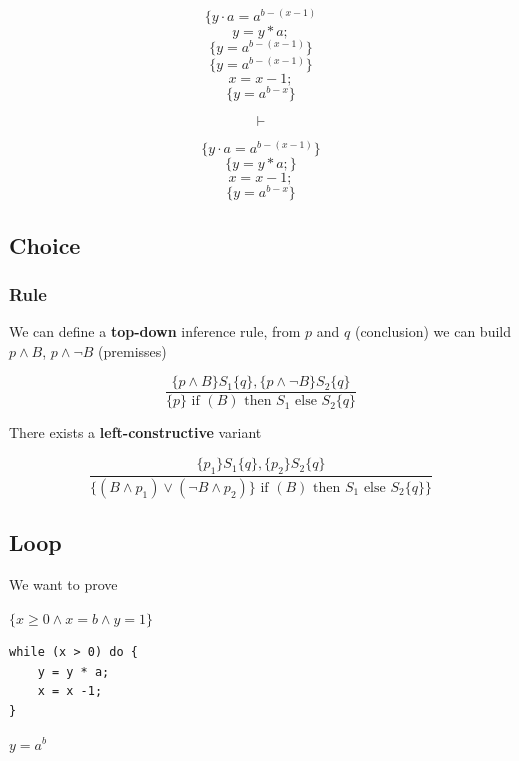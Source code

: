 \documentclass[12pt, a4paper]{book}
\begin{document}
    \begin{minipage}{\linewidth}
        \begin{minipage}{0.4\linewidth}
            $$ \{ y \cdot a = {a}^{b-(x-1)} $$
            $$ y = y * a; $$
            $$ \{ y = {a}^{b-(x-1)} \} $$
            \bigskip
            $$ \{ y = {a}^{b-(x-1)} \} $$
            $$ x = x - 1; $$
            $$ \{ y = {a}^{b-x} \} $$
        \end{minipage}
        \begin{minipage}{0.05\linewidth}
            $$ \vdash $$
        \end{minipage}
        \begin{minipage}{0.4\linewidth}
            $$ \{ y \cdot a = {a}^{b-(x-1)} \} $$
            $$ \{ y = y * a; \} $$
            $$ x = x - 1; $$
            $$ \{ y = {a}^{b-x} \} $$
        \end{minipage}
    \end{minipage}

    \subsection{Choice}

    \subsubsection{Rule}

    We can define a \textbf{top-down} inference rule, from $p$ and $q$
    (conclusion) we can build $p \land B$, $p \land \lnot B$ (premisses)

    $$
    \frac
    { \{ p \land B \} S_1 \{ q \}, \{ p \land \lnot B \} S_2 \{ q \} }
    { \{ p \} \textrm{ if } (B) \textrm{ then } S_1 \textrm{ else } S_2 \{ q \} }
    $$

    There exists a \textbf{left-constructive} variant

    $$
    \frac
    { \{ p_1 \} S_1 \{ q \}, \{ p_2 \} S_2 \{ q \} }
    { \{ (B \land p_1 ) \lor (\lnot B \land p_2 ) \} \textrm{ if } (B) \textrm{ then } S_1 \textrm{ else } S_2 \{ q \} \} }
    $$

    \subsection{Loop}

    We want to prove

    $ \{ x \ge 0 \land x = b \land y =1 \}$
\begin{lstlisting}
while (x > 0) do {
    y = y * a;
    x = x -1;
}
\end{lstlisting}
    $ y = {a}^{b} $
\end{document}
